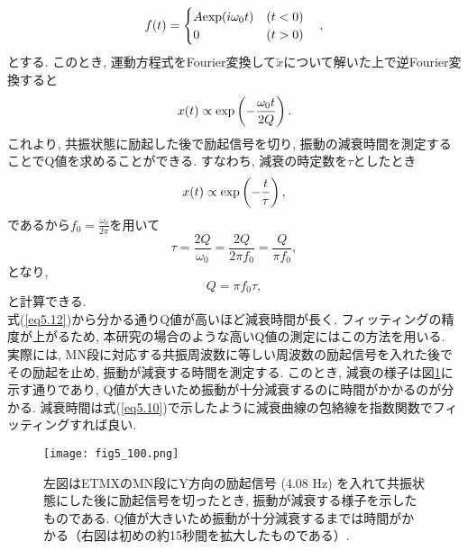 \begin{equation}
f(t) = 
    \begin{cases}
        {A{\rm exp}(i\omega_0t) \quad (t<0)}\\
        {0 \quad\quad\quad \quad\quad\,\, (t>0)}
    \end{cases},
\end{equation}
とする. このとき, 運動方程式をFourier変換して$\tilde{x}$について解いた上で逆Fourier変換すると
\begin{equation}
x(t)\propto {\rm exp}\left(-\frac{\omega_0t}{2Q}\right).
\end{equation}
これより, 共振状態に励起した後で励起信号を切り, 振動の減衰時間を測定することでQ値を求めることができる. すなわち, 減衰の時定数を$\tau$としたとき
\begin{equation}
x(t)\propto {\rm exp}\left(-\frac{t}{\tau}\right),
\label{eq5.10}
\end{equation}
であるから$f_0=\frac{\omega_0}{2\pi}$を用いて
\begin{equation}
\tau=\frac{2Q}{\omega_0}=\frac{2Q}{2\pi f_0}=\frac{Q}{\pi f_0},
\end{equation}
となり, 
\begin{equation}
Q=\pi f_0\tau,
\label{eq5.12}
\end{equation}
と計算できる. \\
\quad 式(\ref{eq5.12})から分かる通りQ値が高いほど減衰時間が長く, フィッティングの精度が上がるため, 本研究の場合のような高いQ値の測定にはこの方法を用いる. \\
\quad 実際には, MN段に対応する共振周波数に等しい周波数の励起信号を入れた後でその励起を止め, 振動が減衰する時間を測定する. このとき, 減衰の様子は図\ref{fig5.8}に示す通りであり, Q値が大きいため振動が十分減衰するのに時間がかかるのが分かる. 減衰時間は式(\ref{eq5.10})で示したように減衰曲線の包絡線を指数関数でフィッティングすれば良い. 
\begin{figure}[H]
\begin{center}
\texttt{[image: fig5\_100.png]}
\caption[励起信号を切った後の減衰の様子]{左図はETMXのMN段にY方向の励起信号 (4.08 Hz) を入れて共振状態にした後に励起信号を切ったとき, 振動が減衰する様子を示したものである. Q値が大きいため振動が十分減衰するまでは時間がかかる（右図は初めの約15秒間を拡大したものである）. }
\label{fig5.8}
\end{center}
\end{figure}

